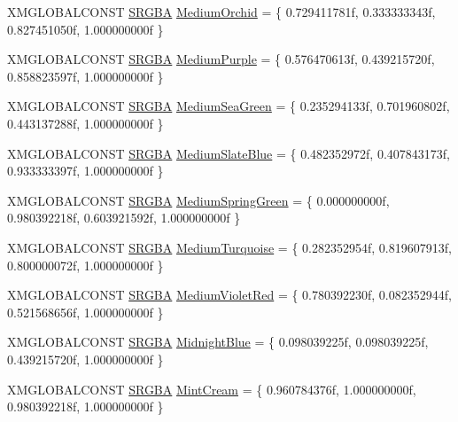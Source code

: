 \begin{DoxyCompactItemize}
\item 
X\+M\+G\+L\+O\+B\+A\+L\+C\+O\+N\+ST \hyperlink{structmage_1_1_s_r_g_b_a}{S\+R\+G\+BA} \hyperlink{namespacemage_1_1color_ad03bd3d3bae08d9fba0808ab7acb1faf}{Medium\+Orchid} = \{ 0.\+729411781f, 0.\+333333343f, 0.\+827451050f, 1.\+000000000f \}
\item 
X\+M\+G\+L\+O\+B\+A\+L\+C\+O\+N\+ST \hyperlink{structmage_1_1_s_r_g_b_a}{S\+R\+G\+BA} \hyperlink{namespacemage_1_1color_a5cd4763988829ae4c93dde2a3f05535b}{Medium\+Purple} = \{ 0.\+576470613f, 0.\+439215720f, 0.\+858823597f, 1.\+000000000f \}
\item 
X\+M\+G\+L\+O\+B\+A\+L\+C\+O\+N\+ST \hyperlink{structmage_1_1_s_r_g_b_a}{S\+R\+G\+BA} \hyperlink{namespacemage_1_1color_a015842619a356e8cd61d0feac357c5b8}{Medium\+Sea\+Green} = \{ 0.\+235294133f, 0.\+701960802f, 0.\+443137288f, 1.\+000000000f \}
\item 
X\+M\+G\+L\+O\+B\+A\+L\+C\+O\+N\+ST \hyperlink{structmage_1_1_s_r_g_b_a}{S\+R\+G\+BA} \hyperlink{namespacemage_1_1color_a624570fd8079b101e1d943240c6f8d69}{Medium\+Slate\+Blue} = \{ 0.\+482352972f, 0.\+407843173f, 0.\+933333397f, 1.\+000000000f \}
\item 
X\+M\+G\+L\+O\+B\+A\+L\+C\+O\+N\+ST \hyperlink{structmage_1_1_s_r_g_b_a}{S\+R\+G\+BA} \hyperlink{namespacemage_1_1color_a778d15a5410b97b78afb0a05e6c730b4}{Medium\+Spring\+Green} = \{ 0.\+000000000f, 0.\+980392218f, 0.\+603921592f, 1.\+000000000f \}
\item 
X\+M\+G\+L\+O\+B\+A\+L\+C\+O\+N\+ST \hyperlink{structmage_1_1_s_r_g_b_a}{S\+R\+G\+BA} \hyperlink{namespacemage_1_1color_ae5f2fc39acc639e47c8c9564f3faa2a9}{Medium\+Turquoise} = \{ 0.\+282352954f, 0.\+819607913f, 0.\+800000072f, 1.\+000000000f \}
\item 
X\+M\+G\+L\+O\+B\+A\+L\+C\+O\+N\+ST \hyperlink{structmage_1_1_s_r_g_b_a}{S\+R\+G\+BA} \hyperlink{namespacemage_1_1color_a07c4737644b67f7a05c82385001511d8}{Medium\+Violet\+Red} = \{ 0.\+780392230f, 0.\+082352944f, 0.\+521568656f, 1.\+000000000f \}
\item 
X\+M\+G\+L\+O\+B\+A\+L\+C\+O\+N\+ST \hyperlink{structmage_1_1_s_r_g_b_a}{S\+R\+G\+BA} \hyperlink{namespacemage_1_1color_ab3679ab1975558f6924fcf33e3790e48}{Midnight\+Blue} = \{ 0.\+098039225f, 0.\+098039225f, 0.\+439215720f, 1.\+000000000f \}
\item 
X\+M\+G\+L\+O\+B\+A\+L\+C\+O\+N\+ST \hyperlink{structmage_1_1_s_r_g_b_a}{S\+R\+G\+BA} \hyperlink{namespacemage_1_1color_a9cd76a72cfc51cfbf852f77fe2811b51}{Mint\+Cream} = \{ 0.\+960784376f, 1.\+000000000f, 0.\+980392218f, 1.\+000000000f \}

\end{DoxyCompactItemize}

